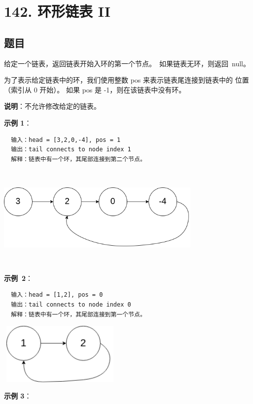 \newpage
\section{142. 环形链表 II}
\label{leetcode:142}

\subsection{题目}

给定一个链表，返回链表开始入环的第一个节点。 如果链表无环，则返回 null。

为了表示给定链表中的环，我们使用整数 pos 来表示链表尾连接到链表中的
位置（索引从 0 开始）。 如果 pos 是 -1，则在该链表中没有环。

\textbf{说明}：不允许修改给定的链表。

\textbf{示例 1}：

\begin{verbatim}
  输入：head = [3,2,0,-4], pos = 1
  输出：tail connects to node index 1
  解释：链表中有一个环，其尾部连接到第二个节点。
\end{verbatim}

\includegraphics[width=100mm,height=50mm]{images/leetcode/circularlinkedlist.png}

\textbf{示例 2}：

\begin{verbatim}
  输入：head = [1,2], pos = 0
  输出：tail connects to node index 0
  解释：链表中有一个环，其尾部连接到第一个节点。
\end{verbatim}

\includegraphics[width=60mm,height=30mm]{images/leetcode/circularlinkedlist_test2.png}

\textbf{示例 3}：

